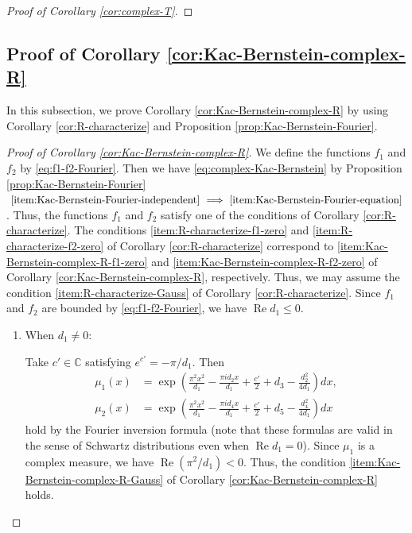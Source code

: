 \documentclass[12pt]{article}
\theoremstyle{definition}
\theoremstyle{remark}
\numberwithin{equation}{section}
\numberwithin{figure}{section}
\numberwithin{table}{section}
\DeclareMathOperator{\re}{Re}
\begin{document}
\begin{proof}[Proof of Corollary \ref{cor:complex-T}]
\end{proof}

\subsection{Proof of Corollary \ref{cor:Kac-Bernstein-complex-R}}
\label{subsec:Kac-Bernstein-complex-R}

In this subsection, we prove Corollary \ref{cor:Kac-Bernstein-complex-R} by using Corollary \ref{cor:R-characterize} and Proposition \ref{prop:Kac-Bernstein-Fourier}.

\begin{proof}[Proof of Corollary \ref{cor:Kac-Bernstein-complex-R}]

We define the functions $ f_1 $ and $ f_2 $ by \eqref{eq:f1-f2-Fourier}.
Then we have \eqref{eq:complex-Kac-Bernstein} by Proposition \ref{prop:Kac-Bernstein-Fourier} $ \text{ \ref{item:Kac-Bernstein-Fourier-independent} } \Longrightarrow \text{ \ref{item:Kac-Bernstein-Fourier-equation} } $.
Thus, the functions $ f_1 $ and $ f_2 $ satisfy one of the conditions of Corollary \ref{cor:R-characterize}.
The conditions \ref{item:R-characterize-f1-zero} and \ref{item:R-characterize-f2-zero} of Corollary \ref{cor:R-characterize} correspond to \ref{item:Kac-Bernstein-complex-R-f1-zero} and \ref{item:Kac-Bernstein-complex-R-f2-zero} of Corollary \ref{cor:Kac-Bernstein-complex-R}, respectively.
Thus, we may assume the condition \ref{item:R-characterize-Gauss} of Corollary \ref{cor:R-characterize}.
Since $ f_1 $ and $ f_2 $ are bounded by \eqref{eq:f1-f2-Fourier}, we have $ \re d_1 \leq 0 $.

\begin{enumerate}[label=(Case \arabic*)]
\item 
When $ d_1 \neq 0 $:

Take $ c' \in \mathbb{ C } $ satisfying $ e^{ c' } = - \pi / d_1 $.
Then
\begin{align}
\mu_1(x)
& = \exp \left( \frac{ \pi^2 x^2 }{ d_1 } - \frac{ \pi i d_2 x }{ d_1 } + \frac{ c' }{ 2 } + d_3 - \frac{ d_2^2 }{ 4d_1 } \right) dx, \\
\mu_2 ( x )
& = \exp \left( \frac{ \pi^2 x^2 }{ d_1 } - \frac{ \pi i d_4 x }{ d_1 } + \frac{ c' }{ 2 } + d_5 - \frac{ d_4^2 }{ 4d_1 } \right) dx
\end{align}
hold by the Fourier inversion formula (note that these formulas are valid in the sense of Schwartz distributions even when $ \re d_1 = 0 $).
Since $ \mu_1 $ is a complex measure, we have $ \re ( \pi^2 / d_1 ) < 0 $.
Thus, the condition \ref{item:Kac-Bernstein-complex-R-Gauss} of Corollary \ref{cor:Kac-Bernstein-complex-R} holds.


\end{enumerate}
\end{proof}
\end{document}
